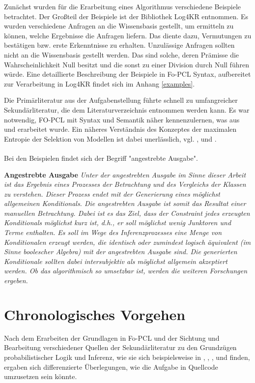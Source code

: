 \documentclass[a4paper, 11pt]{book}
\begin{document}
Zunächst wurden für die Erarbeitung eines Algorithmus verschiedene Beispiele betrachtet. Der Großteil der Beispiele ist der Bibliothek Log4KR entnommen. Es wurden verschiedene Anfragen an die Wissensbasis gestellt, um ermitteln zu können, welche Ergebnisse die Anfragen liefern. Das diente dazu, Vermutungen zu bestätigen bzw. erste Erkenntnisse zu erhalten. Unzulässige Anfragen sollten nicht an die Wissensbasis gestellt werden. Das sind solche, deren Prämisse die Wahrscheinlichkeit Null besitzt und die sonst zu einer Division durch Null führen würde.
Eine detaillierte Beschreibung der Beispiele in Fo-PCL Syntax, aufbereitet zur Verarbeitung in Log4KR findet sich im Anhang \ref{examples}.

Die Primärliteratur aus der Aufgabenstellung \cite{Fis10} führte schnell zu umfangreicher Sekundärliteratur, die dem Literaturverzeichnis entnommen werden kann.
Es war notwendig, FO-PCL mit Syntax und Semantik näher kennenzulernen, was aus \cite{Fis10} und \cite{Fis12} erarbeitet wurde. Ein näheres Verständnis des Konzeptes der maximalen Entropie der Selektion von Modellen ist dabei unerlässlich, vgl. \cite{RKI97}, \cite{BKI08} und \cite{TFLKIB10}.\\
\\
Bei den Beispielen findet sich der Begriff "{}angestrebte Ausgabe"{}.

\noindent
\textbf{Angestrebte Ausgabe}
\label{angestrebte Ausgabe}
\emph{Unter der angestrebten Ausgabe im Sinne dieser Arbeit ist das Ergebnis eines Prozesses der Betrachtung und des Vergleichs der Klassen zu verstehen. Dieser Prozess endet mit der Generierung eines möglichst allgemeinen Konditionals. Die angestrebten Ausgabe ist somit das Resultat einer manuellen Betrachtung. Dabei ist es das Ziel, dass der Constraint jedes erzeugten Konditionals möglichst kurz ist, d.h., er soll möglichst wenig Junktoren und Terme enthalten. Es soll im Wege des Inferenzprozesses eine Menge von Konditionalen erzeugt werden, die identisch oder zumindest logisch äquivalent (im Sinne boolescher Algebra) mit der angestrebten Ausgabe sind.  Die generierten Konditionale sollten dabei intersubjektiv als möglichst allgemein akzeptiert werden.
Ob das algorithmisch so umsetzbar ist, werden die weiteren Forschungen ergeben.}


\section{Chronologisches Vorgehen}
Nach dem Erarbeiten der Grundlagen in Fo-PCL und der Sichtung und Bearbeitung verschiedener Quellen der Sekundärliteratur zu den Grundzügen probabilistischer Logik und Inferenz, wie sie sich beispielsweise in \cite{Fis09}, \cite{Fis10},  \cite{FLT09}, \cite{KIBFT11} und \cite{RKI97} finden, ergaben sich differenzierte Überlegungen, wie die Aufgabe in Quellcode umzusetzen sein könnte.
\end{document}
